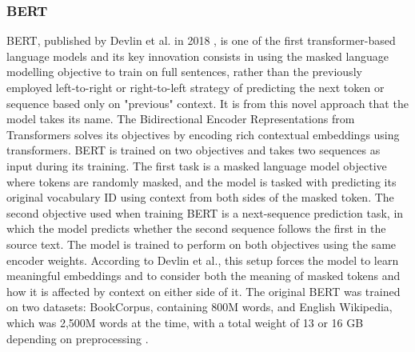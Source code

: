 \documentclass[12pt]{report}
\begin{document}
\subsubsection*{BERT}
BERT, published by Devlin et al. in 2018 \cite{BERT}, is one of the first transformer-based language models and its key innovation consists in using the masked language modelling objective to train on full sentences, rather than the previously employed left-to-right or right-to-left strategy of predicting the next token or sequence based only on "previous" context.
It is from this novel approach that the model takes its name. The Bidirectional Encoder Representations from Transformers solves its objectives by encoding rich contextual embeddings using transformers.
BERT is trained on two objectives and takes two sequences as input during its training.
The first task is a masked language model objective where tokens are randomly masked, and the model is tasked with predicting its original vocabulary ID using context from both sides of the masked token. 
The second objective used when training BERT is a next-sequence prediction task, in which the model predicts whether the second sequence follows the first in the source text.
The model is trained to perform on both objectives using the same encoder weights.
According to Devlin et al., this setup forces the model to learn meaningful embeddings and to consider both the meaning of masked tokens and how it is affected by context on either side of it.
The original BERT was trained on two datasets: BookCorpus, containing 800M words, and English Wikipedia, which was 2,500M words at the time, with a total weight of 13 or 16 GB depending on preprocessing \cite{BERT, roberta}.
\end{document}

